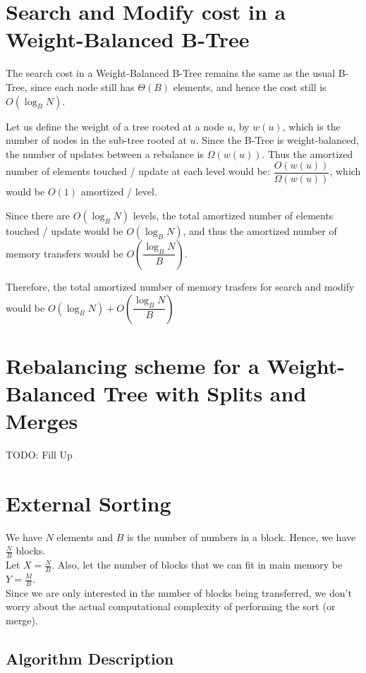 \documentclass{article}
\begin{document}
\clearpage

\clearpage

\section {Search and Modify cost in a Weight-Balanced B-Tree}
The search cost in a Weight-Balanced B-Tree remains the same as the usual
B-Tree, since each node still has $\Theta(B)$ elements, and hence the cost still is
$O(\log_B{N})$.

Let us define the weight of a tree rooted at a node $u$, by $w(u)$, which is the
number of nodes in the sub-tree rooted at $u$. Since the B-Tree is weight-balanced,
the number of updates between a rebalance is $\Omega(w(u))$. Thus the 
amortized number of elements touched / update at each level would be: 
$\dfrac{O(w(u))}{\Omega(w(u))}$, which would be $O(1)$ amortized / level. 

Since there are $O(\log_B{N})$ levels, the total amortized number of elements 
touched / update would be $O(\log_B{N})$, and thus the amortized number of memory transfers
would be $O\left(\dfrac{\log_B{N}}{B}\right)$.

Therefore, the total amortized number of memory trasfers for search and modify would
be $O(\log_B{N}) + O\left(\dfrac{\log_B{N}}{B}\right)$
\clearpage

\section {Rebalancing scheme for a Weight-Balanced Tree with Splits and Merges}
TODO: Fill Up

\clearpage

\section{External Sorting}

We have $N$ elements and $B$ is the number of numbers in a
block. Hence, we have $\frac{N}{B}$ blocks.\\ Let $X =
\frac{N}{B}$. Also, let the number of blocks that we can fit in main
memory be $Y = \frac{M}{B}$.
\\
Since we are only interested in the number of blocks being
transferred, we don't worry about the actual computational complexity
of performing the sort (or merge).\\

\subsection{Algorithm Description}
\end{document}
